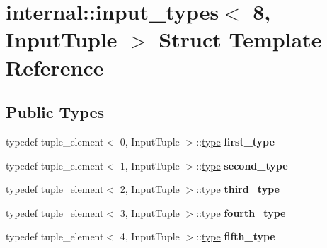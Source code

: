 \hypertarget{structinternal_1_1input__types_3_018_00_01InputTuple_01_4}{}\section{internal\+:\+:input\+\_\+types$<$ 8, Input\+Tuple $>$ Struct Template Reference}
\label{structinternal_1_1input__types_3_018_00_01InputTuple_01_4}
\subsection*{Public Types}
\begin{DoxyCompactItemize}
\item 
\hypertarget{structinternal_1_1input__types_3_018_00_01InputTuple_01_4_a421c506be7edcbc30c05a03bd60266e9}{}typedef tuple\+\_\+element$<$ 0, Input\+Tuple $>$\+::\hyperlink{classinternal_1_1tagged__msg}{type} {\bfseries first\+\_\+type}\label{structinternal_1_1input__types_3_018_00_01InputTuple_01_4_a421c506be7edcbc30c05a03bd60266e9}

\item 
\hypertarget{structinternal_1_1input__types_3_018_00_01InputTuple_01_4_a75bf2bb7f957b2267c6bd2a48023e226}{}typedef tuple\+\_\+element$<$ 1, Input\+Tuple $>$\+::\hyperlink{classinternal_1_1tagged__msg}{type} {\bfseries second\+\_\+type}\label{structinternal_1_1input__types_3_018_00_01InputTuple_01_4_a75bf2bb7f957b2267c6bd2a48023e226}

\item 
\hypertarget{structinternal_1_1input__types_3_018_00_01InputTuple_01_4_ac8aef59a7157d30ebcea84fc8818090e}{}typedef tuple\+\_\+element$<$ 2, Input\+Tuple $>$\+::\hyperlink{classinternal_1_1tagged__msg}{type} {\bfseries third\+\_\+type}\label{structinternal_1_1input__types_3_018_00_01InputTuple_01_4_ac8aef59a7157d30ebcea84fc8818090e}

\item 
\hypertarget{structinternal_1_1input__types_3_018_00_01InputTuple_01_4_afab2047b99736fb50500431754b0ab13}{}typedef tuple\+\_\+element$<$ 3, Input\+Tuple $>$\+::\hyperlink{classinternal_1_1tagged__msg}{type} {\bfseries fourth\+\_\+type}\label{structinternal_1_1input__types_3_018_00_01InputTuple_01_4_afab2047b99736fb50500431754b0ab13}

\item 
\hypertarget{structinternal_1_1input__types_3_018_00_01InputTuple_01_4_a9b3c9d9be90a0db57b8e8a8beb272bca}{}typedef tuple\+\_\+element$<$ 4, Input\+Tuple $>$\+::\hyperlink{classinternal_1_1tagged__msg}{type} {\bfseries fifth\+\_\+type}\label{structinternal_1_1input__types_3_018_00_01InputTuple_01_4_a9b3c9d9be90a0db57b8e8a8beb272bca}


\end{DoxyCompactItemize}
